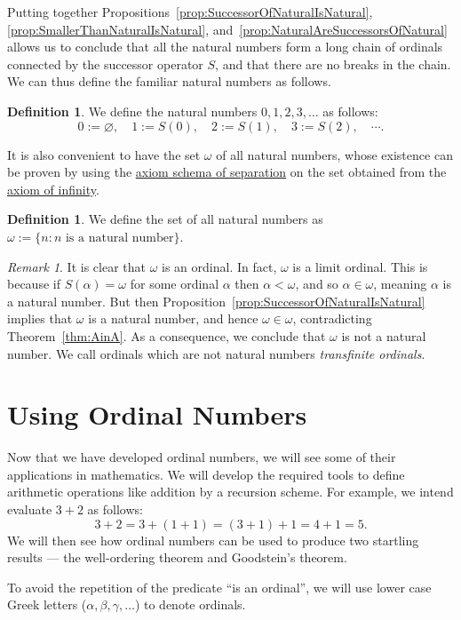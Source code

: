 \documentclass[a4paper,11pt]{article}
\theoremstyle{plain}
\theoremstyle{definition}
\newtheorem{defn}[thm]{Definition}
\theoremstyle{remark}
\newtheorem*{rem}{Remark}
\begin{document}
Putting together Propositions~\ref{prop:SuccessorOfNaturalIsNatural},
\ref{prop:SmallerThanNaturalIsNatural}, and~\ref{prop:NaturalAreSuccessorsOfNatural} allows us to conclude that all the natural numbers form a long chain of ordinals connected by the successor operator $S$, and that there are no breaks in the chain. We can thus define the familiar natural numbers as follows.
\begin{defn}
We define the natural numbers $0,1,2,3,\dots$ as follows:
\[0 := \varnothing, \quad 1:= S(0), \quad 2:= S(1), \quad 3 := S(2), \quad \cdots.\]
\end{defn}

It is also convenient to have the set $\omega$ of all natural numbers, whose existence can be proven by using the \hyperref[axiom:separation]{axiom schema of separation} on the set obtained from the \hyperref[axiom:infinity]{axiom of infinity}.
\begin{defn}
We define the set of all natural numbers as $\omega := \{n : n \text{ is a natural number}\}$.
\end{defn}
\begin{rem}
It is clear that $\omega$ is an ordinal. In fact, $\omega$ is a limit ordinal. This is because if $S(\alpha) = \omega$ for some ordinal $\alpha$ then $\alpha < \omega$, and so $\alpha \in \omega$, meaning $\alpha$ is a natural number. But then Proposition~\ref{prop:SuccessorOfNaturalIsNatural} implies that $\omega$ is a natural number, and hence $\omega \in \omega$, contradicting Theorem~\ref{thm:AinA}. As a consequence, we conclude that $\omega$ is not a natural number. We call ordinals which are not natural numbers \textit{transfinite ordinals}.
\end{rem}

\pagebreak

\section{Using Ordinal Numbers}
Now that we have developed ordinal numbers, we will see some of their applications in mathematics. We will develop the required tools to define arithmetic operations like addition by a recursion scheme. For example, we intend evaluate $3+2$ as follows: 
\[3+2 = 3+(1+1) = (3+1)+1 = 4+1 = 5.\]
We will then see how ordinal numbers can be used to produce two startling results --- the well-ordering theorem and Goodstein's theorem.

To avoid the repetition of the predicate ``is an ordinal'', we will use lower case Greek letters ($\alpha,\beta,\gamma,\dots$) to denote ordinals.
\end{document}
